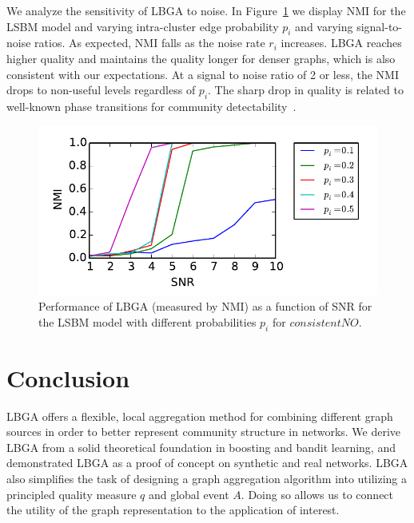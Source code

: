 \documentclass{article}
\begin{document}
We analyze the sensitivity of LBGA to noise. In
Figure~\ref{fig:sensitivity-analysis} we display NMI for the LSBM model and
varying intra-cluster edge probability $p_i$ and varying signal-to-noise
ratios. As expected, NMI falls as the noise rate $r_i$ increases. LBGA reaches
higher quality and maintains the quality longer for denser graphs, which is
also consistent with our expectations. At a signal to noise ratio of 2 or less,
the NMI drops to non-useful levels regardless of $p_i$. The sharp drop in
quality is related to well-known phase transitions for community
detectability~\cite{nadakuditi2012}.

\begin{figure}[bht]
\includegraphics[scale=0.7]{figures/signal-to-noise-consistentNO.pdf}
\caption{Performance of LBGA (measured by NMI) as a function of SNR for the
LSBM model with different probabilities $p_i$ for $consistentNO$.} 
\label{fig:sensitivity-analysis}
\end{figure}

\section{Conclusion}
\label{sec:conclusion}
LBGA offers a flexible, local aggregation method for combining different graph
sources in order to better represent community structure in networks. We derive
LBGA from a solid theoretical foundation in boosting and bandit learning, and
demonstrated LBGA as a proof of concept on synthetic and real networks. LBGA
also simplifies the task of designing a graph aggregation algorithm into
utilizing a principled quality measure $q$ and global event $A$. Doing so
allows us to connect the utility of the graph representation to the application
of interest. 
\end{document}
